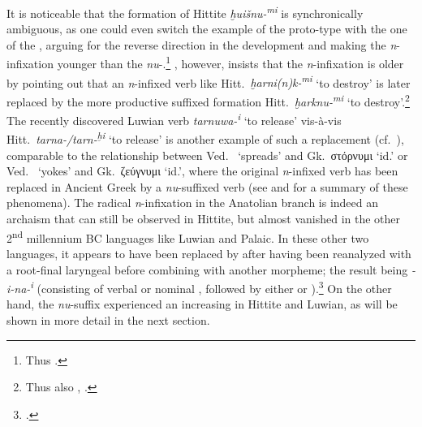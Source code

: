 \documentclass[output=paper,colorlinks,citecolor=brown]{langscibook}
\begin{document}
It is noticeable that the formation of Hittite \textit{ḫuišnu-\textsuperscript{mi}} is synchronically ambiguous, as one could even switch the example of the proto-type with the one of the , arguing for the reverse direction in the development and making the \textit{n}-infixation younger than the \textit{nu}-.\footnote{Thus \citealt{Steer2015}.} \citet[34--36]{Koch1973},   however, insists that the \textit{n}-infixation is older by pointing out that an \textit{n}-infixed verb like Hitt.\ \textit{ḫarni(n)k-\textsuperscript{mi}} ‘to destroy’ is later replaced by the more productive suffixed formation Hitt.\ \textit{ḫarknu-\textsuperscript{mi}} ‘to destroy’.\footnote{Thus also \citealt[192]{Oettinger1979}, \citealt[281--282]{Shatskov2020}.} The recently discovered Luwian verb \textit{tarnuwa-\textsuperscript{i}} ‘to release’ vis-à-vis Hitt.\ \textit{tarna-/tarn-\textsuperscript{ḫi}} ‘to release’ is another example of such a replacement (cf.\ \citealt[109--110]{Melchert2022}), comparable to the relationship between Ved.\  ‘spreads’ and Gk.\ στόρνυμι ‘id.’ or Ved.\  ‘yokes’ and Gk.\ ζεύγνυμι ‘id.’, where the original \textit{n}-infixed verb has been replaced in Ancient Greek by a \textit{nu}-suffixed verb (see \citealt[308--309]{Rasmussen1999} and \citealt{VillanuevaSvenssonforth} for a summary of these phenomena). The radical \textit{n}-infixation in the Anatolian branch is indeed an archaism that can still be observed in Hittite, but almost vanished in the other 2\textsuperscript{nd} millennium BC languages like Luwian and Palaic. In these other two languages, it appears to have been replaced by  after having been reanalyzed with a root-final laryngeal before combining with another morpheme; the result being \textit{\nobreakdash-i\nobreakdash-na-\textsuperscript{i}}   (consisting of verbal   or nominal , followed by either  or ).\footnote{\citealt[540f., 548]{Sasseville2021}.} On the other hand, the \textit{nu}-suffix experienced an increasing  in Hittite and Luwian, as will be shown in more detail in the next section.
\end{document}
